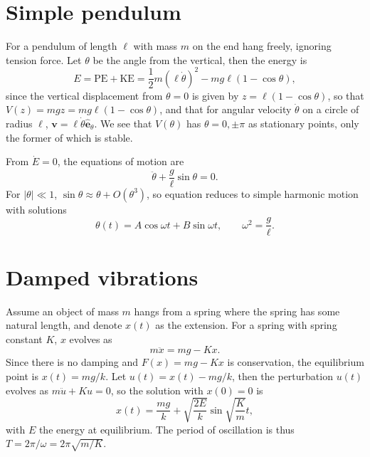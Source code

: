 \documentclass[letter-paper]{tufte-book}
\newcommand{\eb}{\boldsymbol{e}}
\newcommand{\vb}{\boldsymbol{v}}
\begin{document}

\section{Simple pendulum}

For a pendulum of length $\ell$ with mass $m$ on the end hang freely, ignoring
tension force. Let $\theta$ be the angle from the vertical, then the energy is
\begin{equation*}
  E = \mbox{PE} + \mbox{KE} = \frac{1}{2} m(\ell\dot{\theta})^2 - m g \ell (1 -
  \cos\theta),
\end{equation*}
since the vertical displacement from $\theta = 0$ is given by $z = \ell(1 -
\cos\theta)$, so that $V(z) = mgz = mg\ell(1-\cos\theta)$, and that for angular
velocity $\dot{\theta}$ on a circle of radius $\ell$, $\vb = \ell\dot{\theta}
\hat{\eb}_\theta$. We see that $V(\theta)$ has $\theta = 0, \pm\pi$ as
stationary points, only the former of which is stable.

From $\dot{E} = 0$, the equations of motion are
\begin{equation*}
  \ddot{\theta} + \frac{g}{\ell}\sin\theta = 0.
\end{equation*}
For $|\theta| \ll 1$, $\sin\theta \approx \theta + O(\theta^3)$, so equation
reduces to simple harmonic motion with solutions
\begin{equation*}
  \theta(t) = A\cos\omega t + B \sin\omega t, \qquad \omega^2 = \frac{g}{\ell}.
\end{equation*}


\section{Damped vibrations}

Assume an object of mass $m$ hangs from a spring where the spring has some
natural length, and denote $x(t)$ as the extension. For a spring with spring
constant $K$, $x$ evolves as
\begin{equation*}
  m\ddot{x} = mg - Kx.
\end{equation*}
Since there is no damping and $F(x) = mg - Kx$ is conservation, the equilibrium
point is $x(t) = mg/k$. Let $u(t) = x(t) - mg/k$, then the perturbation $u(t)$
evolves as $m\ddot{u} + Ku = 0$, so the solution with $x(0) = 0$ is 
\begin{equation*}
  x(t) = \frac{mg}{k} + \sqrt{\frac{2E}{k}} \sin\sqrt{\frac{K}{m}}t,
\end{equation*}
with $E$ the energy at equilibrium. The period of oscillation is thus $T =
2\pi/\omega = 2\pi\sqrt{m/K}$.
\end{document}
